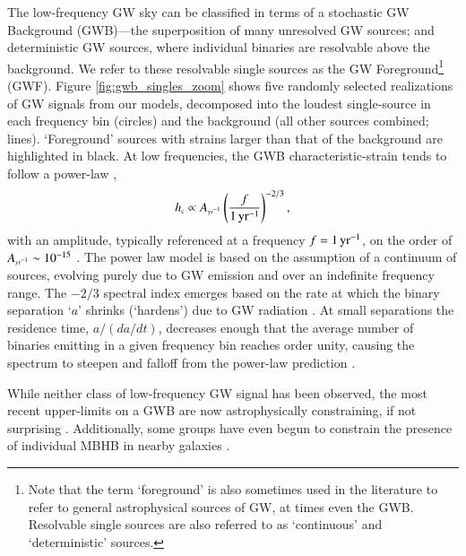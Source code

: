 \documentclass[useAMS, usenatbib]{mnras}  %
\newcommand{\hc}{h_\trt{c}}
\begin{document}
    The low-frequency GW sky can be classified in terms of a stochastic GW Background (GWB)---the superposition of many unresolved GW sources; and deterministic GW sources, where individual binaries are resolvable above the background.  We refer to these resolvable single sources as the GW Foreground\footnote{Note that the term `foreground' is also sometimes used in the literature to refer to general astrophysical sources of GW, at times even the GWB.  Resolvable single sources are also referred to as `continuous' and  `deterministic' sources.} (GWF).  Figure \ref{fig:gwb_singles_zoom} shows five randomly selected realizations of GW signals from our models, decomposed into the loudest single-source in each frequency bin (circles) and the background (all other sources combined; lines).  `Foreground' sources with strains larger than that of the background are highlighted in black.  At low frequencies, the GWB characteristic-strain tends to follow a power-law \citep{phinney2001},
    \begin{equation}
    \label{eq:gwb_plaw}
    \hc \propto \ayr \scale[-2/3]{f}{1 \, \pyr},
    \end{equation}
    with an amplitude, typically referenced at a frequency $f = 1\,\textrm{yr}^{-1}$, on the order of $A_{\textrm{\tiny{yr}}^{-1}} \sim 10^{-15}$ \citep{wyithe2003}.  The power law model is based on the assumption of a continuum of sources, evolving purely due to GW emission and over an indefinite frequency range.  The $-2/3$ spectral index emerges based on the rate at which the binary separation `$a$' shrinks (`hardens') due to GW radiation \citep[see, e.g., the derivation in][]{sesana2008}.  At small separations the residence time, $a / (da/dt)$, decreases enough that the average number of binaries emitting in a given frequency bin reaches order unity, causing the spectrum to steepen and falloff from the power-law prediction \citep{sesana2008}.

    While neither class of low-frequency GW signal has been observed, the most recent upper-limits on a GWB \citep{lentati2015, Arzoumanian201508, shannon2015, Verbiest201602} are now astrophysically constraining, if not surprising \citep[e.g.][]{paper1, middleton2017}.  Additionally, some groups have even begun to constrain the presence of individual MBHB in nearby galaxies \citep[e.g.][]{babak2015, Schutz201510}.
\end{document}
